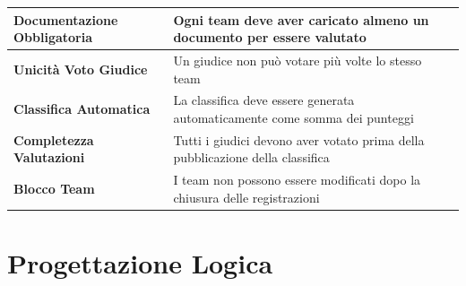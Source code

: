 \documentclass[a4paper, 10pt]{article}
\begin{document}
{\begin{longtable}{
				>{\raggedright\arraybackslash}p{5.5cm}
				>{\raggedright\arraybackslash}p{10cm}
			}
			\textbf{Documentazione Obbligatoria} &
			Ogni team deve aver caricato almeno un documento per essere valutato \\
			\hline
			
			\textbf{Unicità Voto Giudice} &
			Un giudice non può votare più volte lo stesso team\\
			\hline
			
			\textbf{Classifica Automatica} &
			La classifica deve essere generata automaticamente come somma dei punteggi\\
			\hline
			
			\textbf{Completezza Valutazioni} &
			Tutti i giudici devono aver votato prima della pubblicazione della classifica \\
			\hline
			
			\textbf{Blocco Team} &
			I team non possono essere modificati dopo la chiusura delle registrazioni
		\end{longtable}
	}
	\newpage
	\section{Progettazione Logica}
\end{document}
